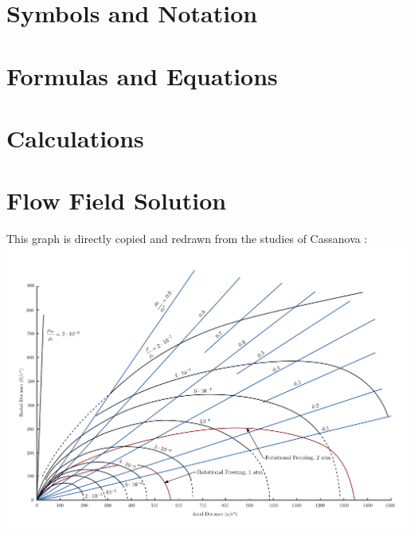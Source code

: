 \appendix

\section*{Symbols and Notation}

\newpage

\section*{Formulas and Equations}

\newpage

\listoffigures

\listoftables
\newpage

\printbibliography
\newpage

\section{Calculations}


\section{Flow Field Solution}
\label{apx:flow-field}
This graph is directly copied and redrawn from the studies of Cassanova \cite{Cassanova1965}:\\
\includegraphics[angle=90, width=\textwidth]{src/03_analytical-work/fig_velocity-distribution.pdf}
